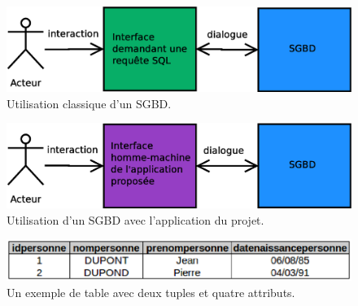 \begin{figure}[!h]
  \centering
  \includegraphics[width=14cm]{images/sans_idb.eps}
  \caption{Utilisation classique d'un SGBD.}
  \label{sans_idb_schema}
\end{figure}

\begin{figure}[!h]
  \centering
  \includegraphics[width=14cm]{images/avec_idb.eps}
  \caption{Utilisation d'un SGBD avec l'application du projet.}
  \label{avec_idb_schema}
\end{figure}

\begin{figure}[!h]
  \centering
  \includegraphics[width=14cm]{images/exemple_table.eps}
  \caption{Un exemple de table avec deux tuples et quatre attributs.}
  \label{exemple_table}
\end{figure}
